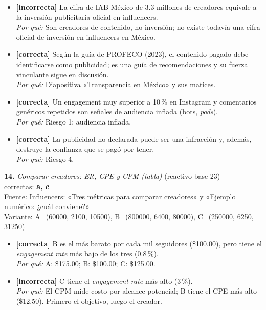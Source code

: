 \documentclass[10pt,letterpaper]{article}
\begin{document}
{\begin{itemize}[leftmargin=1.2em,itemsep=0pt,topsep=1pt,parsep=0pt]
\item[\textbf{a)}] {\footnotesize \textbf{[incorrecta]} La cifra de IAB México de 3.3 millones de creadores equivale a la inversión publicitaria oficial en influencers.\\ \textit{Por qué:} Son creadores de contenido, no inversión; no existe todavía una cifra oficial de inversión en influencers en México.}
\item[\textbf{b)}] {\footnotesize \textbf{[correcta]} Según la guía de PROFECO (2023), el contenido pagado debe identificarse como publicidad; es una guía de recomendaciones y su fuerza vinculante sigue en discusión.\\ \textit{Por qué:} Diapositiva «Transparencia en México» y sus matices.}
\item[\textbf{c)}] {\footnotesize \textbf{[correcta]} Un engagement muy superior a 10\,\% en Instagram y comentarios genéricos repetidos son señales de audiencia inflada (bots, \textit{pods}).\\ \textit{Por qué:} Riesgo 1: audiencia inflada.}
\item[\textbf{d)}] {\footnotesize \textbf{[correcta]} La publicidad no declarada puede ser una infracción y, además, destruye la confianza que se pagó por tener.\\ \textit{Por qué:} Riesgo 4.}
\end{itemize}
\vspace{3pt}\noindent\textbf{14.} \textit{Comparar creadores: ER, CPE y CPM (tabla)} (reactivo base 23) — correctas: \textbf{a, c}\\[-1pt]
{\scriptsize Fuente: Influencers: «Tres métricas para comparar creadores» y «Ejemplo numérico: ¿cuál conviene?»}
\\{\scriptsize Variante: A=(60000, 2100, 10500), B=(800000, 6400, 80000), C=(250000, 6250, 31250)}
\begin{itemize}[leftmargin=1.2em,itemsep=0pt,topsep=1pt,parsep=0pt]
\item[\textbf{a)}] {\footnotesize \textbf{[correcta]} B es el más barato por cada mil seguidores (\$100.00), pero tiene el \textit{engagement rate} más bajo de los tres (0.8\,\%).\\ \textit{Por qué:} A: \$175.00; B: \$100.00; C: \$125.00.}
\item[\textbf{b)}] {\footnotesize \textbf{[incorrecta]} C tiene el \textit{engagement rate} más alto (3\,\%).\\ \textit{Por qué:} El CPM mide costo por alcance potencial; B tiene el CPE más alto (\$12.50). Primero el objetivo, luego el creador.}

\end{itemize}}
\end{document}
